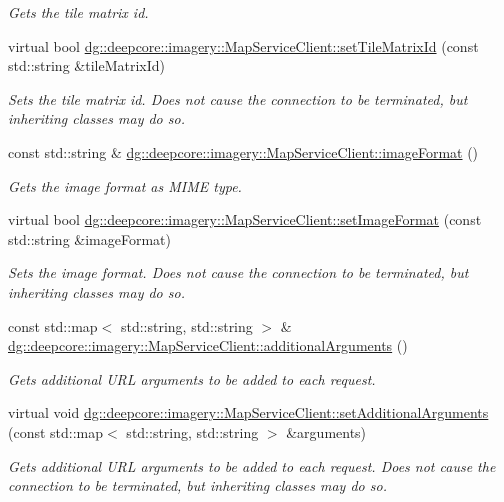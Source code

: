 \begin{DoxyCompactItemize}
\begin{DoxyCompactList}\small\item\em Gets the tile matrix id. \end{DoxyCompactList}\item 
virtual bool \hyperlink{group___imagery_module_ga5f85c6b91d45f419905321b3752aa70c}{dg\+::deepcore\+::imagery\+::\+Map\+Service\+Client\+::set\+Tile\+Matrix\+Id} (const std\+::string \&tile\+Matrix\+Id)
\begin{DoxyCompactList}\small\item\em Sets the tile matrix id. Does not cause the connection to be terminated, but inheriting classes may do so. \end{DoxyCompactList}\item 
const std\+::string \& \hyperlink{group___imagery_module_ga847bc79084bf9856525ce04240a24428}{dg\+::deepcore\+::imagery\+::\+Map\+Service\+Client\+::image\+Format} ()
\begin{DoxyCompactList}\small\item\em Gets the image format as M\+I\+ME type. \end{DoxyCompactList}\item 
virtual bool \hyperlink{group___imagery_module_ga9c0fa65750aaf5c860f046eccf6f0fe7}{dg\+::deepcore\+::imagery\+::\+Map\+Service\+Client\+::set\+Image\+Format} (const std\+::string \&image\+Format)
\begin{DoxyCompactList}\small\item\em Sets the image format. Does not cause the connection to be terminated, but inheriting classes may do so. \end{DoxyCompactList}\item 
const std\+::map$<$ std\+::string, std\+::string $>$ \& \hyperlink{group___imagery_module_gae806d1f279ef82bd45c8375e96936836}{dg\+::deepcore\+::imagery\+::\+Map\+Service\+Client\+::additional\+Arguments} ()
\begin{DoxyCompactList}\small\item\em Gets additional U\+RL arguments to be added to each request. \end{DoxyCompactList}\item 
virtual void \hyperlink{group___imagery_module_gac4ab75cb614415087330a2bc36b3a8d7}{dg\+::deepcore\+::imagery\+::\+Map\+Service\+Client\+::set\+Additional\+Arguments} (const std\+::map$<$ std\+::string, std\+::string $>$ \&arguments)
\begin{DoxyCompactList}\small\item\em Gets additional U\+RL arguments to be added to each request. Does not cause the connection to be terminated, but inheriting classes may do so. \end{DoxyCompactList}\item 

\end{DoxyCompactItemize}
